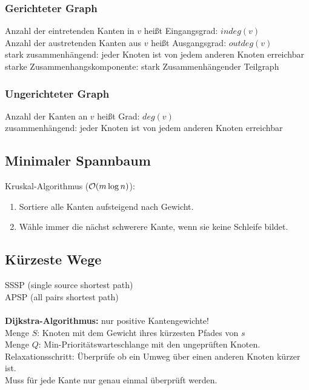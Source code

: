 \documentclass[fs, footer]{latex4ei}
\begin{document}
\begin{multicols*}{4}
{{\subsubsection{Gerichteter Graph}
Anzahl der eintretenden Kanten in $v$ heißt Eingangsgrad: $indeg(v)$\\
Anzahl der austretenden Kanten aus $v$ heißt Ausgangsgrad: $outdeg(v)$\\

stark zusammenhängend: jeder Knoten ist von jedem anderen Knoten erreichbar\\
starke Zusammenhangskomponente: stark Zusammenhängender Teilgraph\\


\subsubsection{Ungerichteter Graph}
Anzahl der Kanten an $v$ heißt Grad: $deg(v)$\\

zusammenhängend: jeder Knoten ist von jedem anderen Knoten erreichbar\\

	\subsection{Minimaler Spannbaum}
	Kruskal-Algorithmus ($\operatorname{\mathcal O}(m\log n)$):
	\begin{enumerate}\itemsep-2pt
		\item Sortiere alle Kanten aufsteigend nach Gewicht.
		\item Wähle immer die nächst schwerere Kante, wenn sie keine Schleife bildet.
	\end{enumerate}
	\subsection{Kürzeste Wege}
	SSSP (single source shortest path)\\
	APSP (all pairs shortest path)\\
	\\
	\textbf{Dijkstra-Algorithmus:} nur positive Kantengewichte!\\
	Menge $S$: Knoten mit dem Gewicht ihres kürzesten Pfades von $s$\\
	Menge $Q$: Min-Prioritätswarteschlange mit den ungeprüften Knoten.\\ 
	Relaxationsschritt: Überprüfe ob ein Umweg über einen anderen Knoten kürzer ist.\\
	Muss für jede Kante nur genau einmal überprüft werden.

}}
\end{multicols*}
\end{document}
